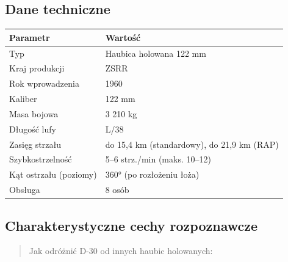 \documentclass[12pt,oneside]{book}
\begin{document}
\subsection{Dane techniczne}\label{dane-techniczne-26}

\begin{longtable}[]{@{}ll@{}}
\toprule\noalign{}
Parametr & Wartość \\
\midrule\noalign{}
\endhead
\bottomrule\noalign{}
\endlastfoot
Typ & Haubica holowana 122 mm \\
Kraj produkcji & ZSRR \\
Rok wprowadzenia & 1960 \\
Kaliber & 122 mm \\
Masa bojowa & 3 210 kg \\
Długość lufy & L/38 \\
Zasięg strzału & do 15,4 km (standardowy), do 21,9 km (RAP) \\
Szybkostrzelność & 5--6 strz./min (maks. 10--12) \\
Kąt ostrzału (poziomy) & 360° (po rozłożeniu łoża) \\
Obsługa & 8 osób \\
\end{longtable}

\subsection{Charakterystyczne cechy
rozpoznawcze}\label{charakterystyczne-cechy-rozpoznawcze-26}

\begin{quote}
Jak odróżnić D-30 od innych haubic holowanych:
\end{quote}
\end{document}
